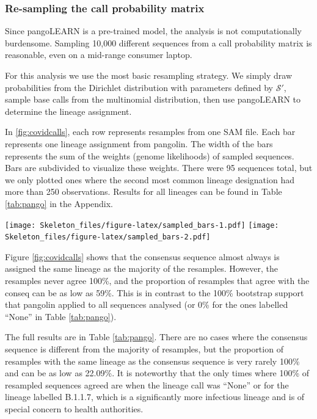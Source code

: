 \documentclass[
]{article}
\newcommand{\nps}{\mathcal{S}} %
\begin{document}
\hypertarget{re-sampling-the-call-probability-matrix}{%
\subsubsection{Re-sampling the call probability
matrix}\label{re-sampling-the-call-probability-matrix}}

Since pangoLEARN is a pre-trained model, the analysis is not
computationally burdensome. Sampling 10,000 different sequences from a
call probability matrix is reasonable, even on a mid-range consumer
laptop.

For this analysis we use the most basic resampling strategy. We simply
draw probabilities from the Dirichlet distribution with parameters
defined by \(\nps'\), sample base calls from the multinomial
distribution, then use pangoLEARN to determine the lineage assignment.

In \ref{fig:covidcalls}, each row represents resamples from one SAM
file. Each bar represents one lineage assignment from pangolin. The
width of the bars represents the sum of the weights (genome likelihoods)
of sampled sequences. Bars are subdivided to visualize these weights.
There were 95 sequences total, but we only plotted ones where the second
most common lineage designation had more than 250 observations. Results
for all lineages can be found in Table \ref{tab:pango} in the Appendix.

\texttt{[image: Skeleton\_files/figure-latex/sampled\_bars-1.pdf]}
\texttt{[image: Skeleton\_files/figure-latex/sampled\_bars-2.pdf]}

Figure \ref{fig:covidcalls} shows that the consensus sequence almost
always is assigned the same lineage as the majority of the resamples.
However, the resamples never agree 100\%, and the proportion of
resamples that agree with the conseq can be as low as 59\%. This is in
contrast to the 100\% bootstrap support that pangolin applied to all
sequences analysed (or 0\% for the ones labelled ``None'' in Table
\ref{tab:pango}).

The full results are in Table \ref{tab:pango}. There are no cases where
the consensus sequence is different from the majority of resamples, but
the proportion of resamples with the same lineage as the consensus
sequence is very rarely 100\% and can be as low as 22.09\%. It is
noteworthy that the only times where 100\% of resampled sequences agreed
are when the lineage call was ``None'' or for the lineage labelled
B.1.1.7, which is a significantly more infectious lineage and is of
special concern to health authorities.
\end{document}
